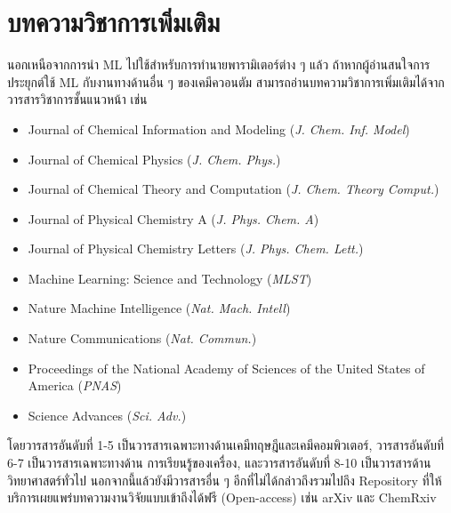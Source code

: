 
\section{บทความวิชาการเพิ่มเติม}
\label{sec:pred_misc_papers}

นอกเหนือจากการนำ ML ไปใช้สำหรับการทำนายพารามิเตอร์ต่าง ๆ แล้ว ถ้าหากผู้อ่านสนใจการประยุกต์ใช้ ML กับงานทางด้านอื่น ๆ ของเคมีควอนตัม 
สามารถอ่านบทความวิชาการเพิ่มเติมได้จากวารสารวิชาการชั้นแนวหน้า เช่น 

\begin{itemize}[topsep=0pt,noitemsep]
    \item Journal of Chemical Information and Modeling (\textit{J. Chem. Inf. Model}) 
    
    \item Journal of Chemical Physics (\textit{J. Chem. Phys.}) 
    
    \item Journal of Chemical Theory and Computation (\textit{J. Chem. Theory Comput.}) 
    
    \item Journal of Physical Chemistry A (\textit{J. Phys. Chem. A}) 
    
    \item Journal of Physical Chemistry Letters (\textit{J. Phys. Chem. Lett.}) 
    
    \item Machine Learning: Science and Technology (\textit{MLST}) 
    
    \item Nature Machine Intelligence (\textit{Nat. Mach. Intell}) 
    
    \item Nature Communications (\textit{Nat. Commun.})
    
    \item Proceedings of the National Academy of Sciences of the United States of America (\textit{PNAS}) 
    
    \item Science Advances (\textit{Sci. Adv.}) 
\end{itemize}

\noindent โดยวารสารอันดับที่ 1-5 เป็นวารสารเฉพาะทางด้านเคมีทฤษฎีและเคมีคอมพิวเตอร์, วารสารอันดับที่ 6-7 เป็นวารสารเฉพาะทางด้าน%
การเรียนรู้ของเครื่อง, และวารสารอันดับที่ 8-10 เป็นวารสารด้านวิทยาศาสตร์ทั่วไป นอกจากนี้แล้วยังมีวารสารอื่น ๆ อีกที่ไม่ได้กล่าวถึงรวมไปถึง
Repository ที่ให้บริการเผยแพร่บทความงานวิจัยแบบเข้าถึงได้ฟรี (Open-access) เช่น arXiv และ ChemRxiv

